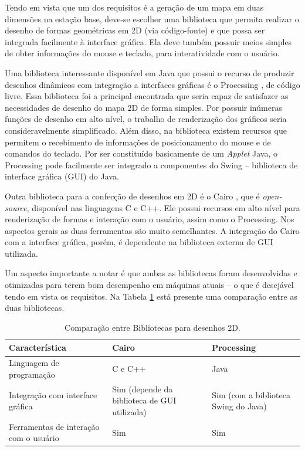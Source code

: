 Tendo em vista que um dos requisitos é a geração de um mapa em duas dimensões na estação base, deve-se escolher uma biblioteca que permita realizar o desenho de formas geométricas em 2D (via código-fonte) e que possa ser integrada facilmente à interface gráfica. Ela deve também possuir meios simples de obter informações do mouse e teclado, para interatividade com o usuário. 

Uma biblioteca interessante disponível em Java que possui o recurso de produzir desenhos dinâmicos com integração a interfaces gráficas é o Processing \cite{processing}, de código livre. Essa biblioteca foi a principal encontrada que seria capaz de satisfazer as necessidades de desenho do mapa 2D de forma simples. Por possuir inúmeras funções de desenho em alto nível, o trabalho de renderização dos gráficos seria consideravelmente simplificado. Além disso, na biblioteca existem recursos que permitem o recebimento de informações de posicionamento do mouse e de comandos do teclado. Por ser constituído basicamente de um \textit{Applet} Java, o Processing pode facilmente ser integrado a componentes do Swing -- biblioteca de interface gráfica (GUI) do Java.


Outra biblioteca para a confecção de desenhos em 2D é o Cairo \cite{cairo}, que é \textit{open-source}, disponível nas linguagens C e C++. Ele possui recursos em alto nível para renderização de formas e interação com o usuário, assim como o Processing. Nos aspectos gerais as duas ferramentas são muito semelhantes. A integração do Cairo com a interface gráfica, porém, é dependente na biblioteca externa de GUI utilizada.

Um aspecto importante a notar é que ambas as bibliotecas foram desenvolvidas e otimizadas para terem bom desempenho em máquinas atuais -- o que é desejável tendo em vista os requisitos. Na Tabela \ref{tab:alternativas_desenho} está presente uma comparação entre as duas bibliotecas.


\begin{table}[h]
  \caption{Comparação entre Bibliotecas para desenhos 2D.}
  \centering
  \begin{tabular}{p{6cm}|p{4cm}p{4cm}}
    \toprule
    \textbf{Característica} & \textbf{Cairo} & \textbf{Processing} \\
    \midrule
    Linguagem de programação & C e C++ & Java \\
    \hline
    Integração com interface gráfica & Sim (depende da biblioteca de GUI utilizada) & Sim (com a biblioteca Swing do Java) \\
    \hline
    Ferramentas de interação com o usuário & Sim & Sim \\
    \bottomrule
  \end{tabular}
  \label{tab:alternativas_desenho}
\end{table}

